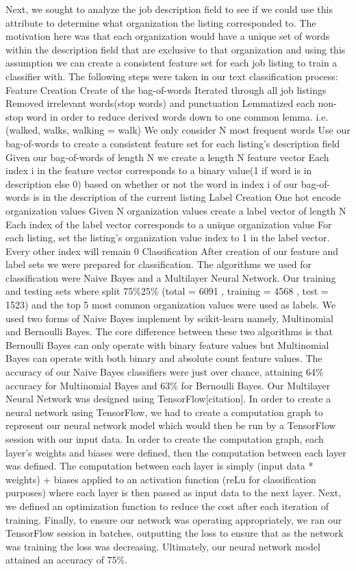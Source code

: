 Next, we sought to analyze the job description field to see if we could use this attribute to determine what organization the listing corresponded to. The motivation here was that each organization would have a unique set of words within the description field that are exclusive to that organization and using this assumption we can create a consistent feature set for each job listing to train a classifier with. The following steps were taken in our text classification process:
Feature Creation
Create of the bag-of-words 
Iterated through all job listings
Removed irrelevant words(stop words) and  punctuation
Lemmatized each non-stop word in order to reduce derived words down to one common lemma. i.e.(walked, walks, walking = walk)
We only consider N most frequent words 
Use our bag-of-words to create a consistent feature set for each listing’s description field
Given our bag-of-words of length N we create a length N feature vector
Each index i  in the feature vector corresponds to a binary value(1 if word is in description else 0) based on whether or not the word in index i of our bag-of-words is in the description of the current listing
Label Creation
One hot encode organization values
Given N organization values create a label vector of length N 
Each index of the label vector corresponds to a unique organization value 
For each listing, set the listing’s organization value index to 1 in the label vector. Every other index will remain 0
Classification
After creation of our feature and label sets we were prepared for classification. The algorithms we used for classification were Naive Bayes and a Multilayer Neural Network. Our training and testing sets where split 75\%25\% (total = 6091 , training = 4568 , test = 1523) and  the top 5 most common organization values were used as labels.  
We used two forms of Naive Bayes implement by scikit-learn namely, Multinomial and Bernoulli Bayes. The core difference between these two algorithms is that Bernoulli Bayes can only operate with binary feature values but Multinomial Bayes can operate with both binary and absolute count feature values. 
The accuracy of our Naive Bayes classifiers were just over chance, attaining 64\% accuracy for Multinomial Bayes and 63\% for Bernoulli Bayes. 
Our Multilayer Neural Network was designed using TensorFlow[citation]. In order to create a neural network using TensorFlow, we had to create a computation graph to represent our neural network model which would then be run by a TensorFlow session with our input data. In order to create the computation graph, each layer’s weights and biases were defined, then the computation between each layer was defined. The computation between each layer is simply (input data * weights) + biases applied to an activation function (reLu for classification purposes) where each layer is then passed as input data to the next layer. Next, we defined an optimization function to reduce the cost after each iteration of training. Finally, to ensure our network was operating appropriately, we ran our TensorFlow session in batches, outputting the loss to ensure that as the network was training the loss was decreasing. Ultimately, our neural network model attained an accuracy of 75\%.


